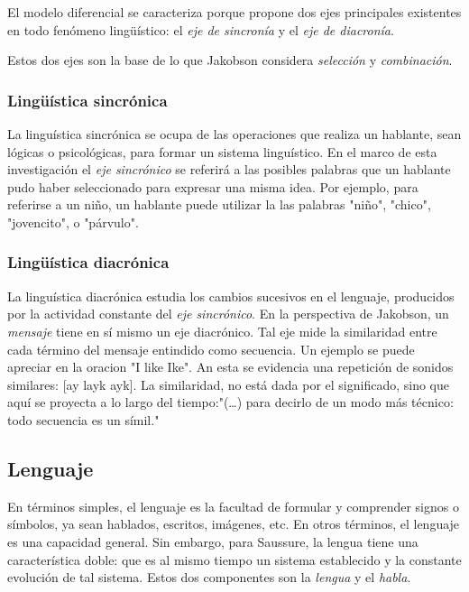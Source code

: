 \documentclass[12pt,letterpaper,twoside]{article}
\begin{document}
El modelo diferencial se caracteriza porque propone dos ejes
principales existentes en todo fenómeno lingüístico: el \emph{eje de
sincronía} y el \emph{eje de diacronía}.

Estos dos ejes son la base de lo que Jakobson considera \emph{selección} y
\emph{combinación}.


\subsubsection{Lingüística sincrónica}
\label{sec:org0d3a80b}

La linguística sincrónica se ocupa de las
operaciones que realiza un hablante, sean lógicas o psicológicas,
para formar un sistema linguístico. En el
marco de esta investigación el \emph{eje sincrónico} se referirá a las
posibles palabras que un hablante pudo haber seleccionado para
expresar una misma idea. Por ejemplo, para referirse a un
niño, un hablante puede utilizar la las palabras "niño", "chico",
"jovencito", o "párvulo".


\subsubsection{Lingüística diacrónica}
\label{sec:orgcd05aaf}

La linguística diacrónica estudia los cambios sucesivos en el
lenguaje, producidos por la actividad constante del \emph{eje
sincrónico}. En la perspectiva de Jakobson, un \emph{mensaje} tiene en
sí mismo un eje diacrónico. Tal eje mide la similaridad entre cada
término del mensaje entindido como secuencia. Un ejemplo se puede
apreciar en la oracion "I like Ike". An esta se evidencia una
repetición de sonidos similares: [ay layk ayk]. La similaridad, no
está dada por el significado, sino que aquí se proyecta a lo largo
del tiempo:"(\ldots{}) para decirlo de un modo más técnico: todo
secuencia es un símil."

\subsection{Lenguaje}
\label{sec:org457275f}
En términos simples, el lenguaje es la facultad de formular y
comprender signos o símbolos, ya sean hablados, escritos,
imágenes, etc.  En otros términos, el lenguaje es una capacidad
general. Sin embargo, para Saussure, la lengua tiene una
característica doble: que es al mismo tiempo un sistema
establecido y la constante evolución de tal sistema. Estos dos
componentes son la \emph{lengua} y el \emph{habla}.
\end{document}
